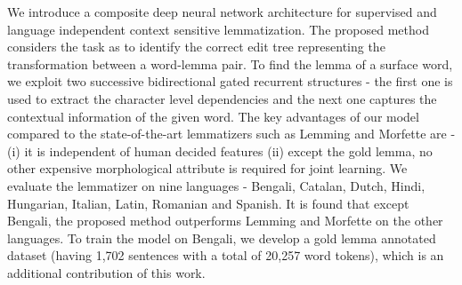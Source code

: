 We introduce a composite deep neural network architecture for supervised and language independent context sensitive lemmatization. The proposed method considers the task as to identify the correct edit tree representing the transformation between a word-lemma pair. To find the lemma of a surface word, we exploit two successive bidirectional gated recurrent structures - the first one is used to extract the character level dependencies and the next one captures the contextual information of the given word. The key advantages of our model compared to the state-of-the-art lemmatizers such as Lemming and Morfette are - (i) it is independent of human decided features (ii) except the gold lemma, no other expensive morphological attribute is required for joint learning. We evaluate the lemmatizer on nine languages - Bengali, Catalan, Dutch, Hindi, Hungarian, Italian, Latin, Romanian and Spanish. It is found that except Bengali, the proposed method outperforms Lemming and Morfette on the other languages. To train the model on Bengali, we develop a gold lemma annotated dataset (having 1,702 sentences with a total of 20,257 word tokens), which is an additional contribution of this work.
